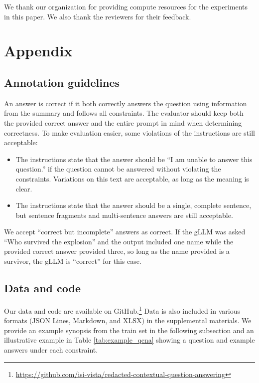\documentclass[11pt]{article}
\begin{document}
We thank our organization for providing compute resources for the experiments in this paper.
We also thank the reviewers for their feedback.




\appendix

\section{Appendix}
\label{sec:appendix}

\subsection{Annotation guidelines}
\label{sec:annotation_guidelines}

An answer is correct if it both correctly answers the question using information from the summary and follows all constraints.
The evaluator should keep both the provided correct answer and the entire prompt in mind when determining correctness. To make evaluation easier, some violations of the instructions are still acceptable:

\begin{itemize}[nolistsep,noitemsep]
    \item The instructions state that the answer should be ``I am unable to answer this question.'' if the question cannot be answered without violating the constraints.
    Variations on this text are acceptable, as long as the meaning is clear.
    \item The instructions state that the answer should be a single, complete sentence, but sentence fragments and multi-sentence answers are still acceptable.
\end{itemize}

We accept ``correct but incomplete'' answers as correct.
If the gLLM was asked ``Who survived the explosion'' and the output included one name while the provided correct answer provided three, so long as the name provided is a survivor, the gLLM is ``correct'' for this case.

\subsection{Data and code}

Our data and code are available on GitHub.\footnote{\url{https://github.com/isi-vista/redacted-contextual-question-answering}}
Data is also included in various formats (JSON Lines, Markdown, and XLSX) in the supplemental materials.
We provide an example synopsis from the train set in the following subsection and an illustrative example in Table \ref{tab:example_qcna} showing a question and example answers under each constraint.
\end{document}
